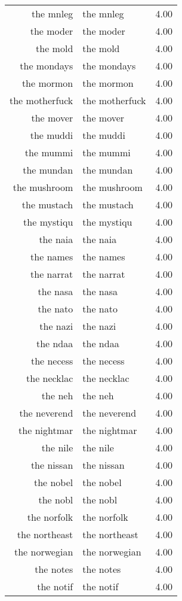 \begin{table}[ht]
\begin{tabular}{rlr}
  the mnleg & the mnleg & 4.00 \\ 
  the moder & the moder & 4.00 \\ 
  the mold & the mold & 4.00 \\ 
  the mondays & the mondays & 4.00 \\ 
  the mormon & the mormon & 4.00 \\ 
  the motherfuck & the motherfuck & 4.00 \\ 
  the mover & the mover & 4.00 \\ 
  the muddi & the muddi & 4.00 \\ 
  the mummi & the mummi & 4.00 \\ 
  the mundan & the mundan & 4.00 \\ 
  the mushroom & the mushroom & 4.00 \\ 
  the mustach & the mustach & 4.00 \\ 
  the mystiqu & the mystiqu & 4.00 \\ 
  the naia & the naia & 4.00 \\ 
  the names & the names & 4.00 \\ 
  the narrat & the narrat & 4.00 \\ 
  the nasa & the nasa & 4.00 \\ 
  the nato & the nato & 4.00 \\ 
  the nazi & the nazi & 4.00 \\ 
  the ndaa & the ndaa & 4.00 \\ 
  the necess & the necess & 4.00 \\ 
  the necklac & the necklac & 4.00 \\ 
  the neh & the neh & 4.00 \\ 
  the neverend & the neverend & 4.00 \\ 
  the nightmar & the nightmar & 4.00 \\ 
  the nile & the nile & 4.00 \\ 
  the nissan & the nissan & 4.00 \\ 
  the nobel & the nobel & 4.00 \\ 
  the nobl & the nobl & 4.00 \\ 
  the norfolk & the norfolk & 4.00 \\ 
  the northeast & the northeast & 4.00 \\ 
  the norwegian & the norwegian & 4.00 \\ 
  the notes & the notes & 4.00 \\ 
  the notif & the notif & 4.00 \\ 

\end{tabular}
\end{table}
